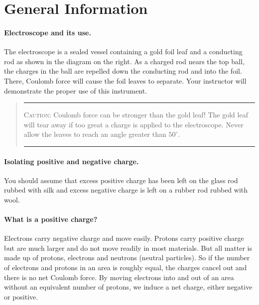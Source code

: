 \section{General Information}

\paragraph{Electroscope and its use.} 
The electroscope is a sealed vessel containing a gold foil leaf and a conducting rod as shown in the diagram on the right.  As a charged rod nears the top ball, the charges in the ball are repelled down the conducting rod and into the foil.  There, Coulomb force will cause the foil leaves to separate.  Your instructor will demonstrate the proper use of this instrument.

\clearpage
\begin{quote} \hrule 
\textsc{Caution:} Coulomb force can be stronger than the gold leaf!  The gold leaf will tear away if too great a charge is applied to the electroscope.  Never allow the leaves to reach an angle greater than $50^{\circ}$.
\vspace{7pt}
\hrule 
\end{quote}

\paragraph{Isolating positive and negative charge.}  You should assume that excess positive charge has been left on the glass rod rubbed with silk and excess negative charge is left on a rubber rod rubbed with wool.

\paragraph{What is a positive charge?}  Electrons carry negative charge and move easily.  Protons carry positive charge but are much larger and do not move readily in most materials.  But all matter is made up of protons, electrons and neutrons (neutral particles).  So if the number of electrons and protons in an area is roughly equal, the charges cancel out and there is no net Coulomb force.  By moving electrons into and out of an area without an equivalent number of protons, we induce a net charge, either negative or positive.  


